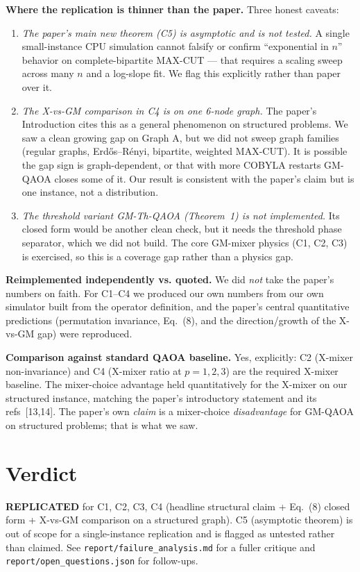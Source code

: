 \documentclass[11pt]{article}
\begin{document}
\textbf{Where the replication is thinner than the paper.} Three honest caveats:
\begin{enumerate}
  \item \emph{The paper's main new theorem (C5) is asymptotic and is not tested.} A single small-instance CPU simulation cannot falsify or confirm ``exponential in $n$'' behavior on complete-bipartite MAX-CUT --- that requires a scaling sweep across many $n$ and a log-slope fit. We flag this explicitly rather than paper over it.
  \item \emph{The X-vs-GM comparison in C4 is on \emph{one} 6-node graph.} The paper's Introduction cites this as a general phenomenon on structured problems. We saw a clean growing gap on Graph A, but we did not sweep graph families (regular graphs, Erd\H{o}s--R\'enyi, bipartite, weighted MAX-CUT). It is possible the gap sign is graph-dependent, or that with more COBYLA restarts GM-QAOA closes some of it. Our result is consistent with the paper's claim but is one instance, not a distribution.
  \item \emph{The threshold variant GM-Th-QAOA (Theorem~1) is not implemented.} Its closed form would be another clean check, but it needs the threshold phase separator, which we did not build. The core GM-mixer physics (C1, C2, C3) is exercised, so this is a coverage gap rather than a physics gap.
\end{enumerate}

\textbf{Reimplemented independently vs. quoted.} We did \emph{not} take the paper's numbers on faith. For C1--C4 we produced our own numbers from our own simulator built from the operator definition, and the paper's central quantitative predictions (permutation invariance, Eq.~(8), and the direction/growth of the X-vs-GM gap) were reproduced.

\textbf{Comparison against standard QAOA baseline.} Yes, explicitly: C2 (X-mixer non-invariance) and C4 (X-mixer ratio at $p=1,2,3$) are the required X-mixer baseline. The mixer-choice advantage held quantitatively for the X-mixer on our structured instance, matching the paper's introductory statement and its refs~[13,14]. The paper's own \emph{claim} is a mixer-choice \emph{disadvantage} for GM-QAOA on structured problems; that is what we saw.

\section{Verdict}
\textbf{REPLICATED} for C1, C2, C3, C4 (headline structural claim + Eq.~(8) closed form + X-vs-GM comparison on a structured graph). C5 (asymptotic theorem) is out of scope for a single-instance replication and is flagged as untested rather than claimed. See \texttt{report/failure\_analysis.md} for a fuller critique and \texttt{report/open\_questions.json} for follow-ups.
\end{document}
